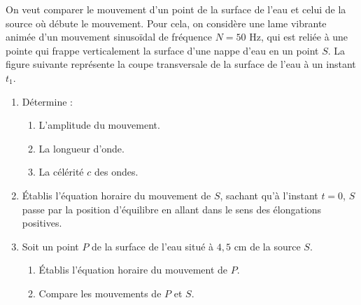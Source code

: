 \documentclass[11pt]{article}
\begin{document}
On veut comparer le mouvement d'un point de la surface de l'eau et celui de la source où débute le mouvement. Pour cela, on considère une lame vibrante animée d'un mouvement sinusoïdal de fréquence $N = 50$ Hz, qui est reliée à une pointe qui frappe verticalement la surface d'une nappe d'eau en un point $S$. La figure suivante représente la coupe transversale de la surface de l'eau à un instant $t_1$.

\begin{center}
\end{center}

\begin{enumerate}
  \item Détermine :
  \begin{enumerate}[label=\alph*.]
    \item L'amplitude du mouvement.
    \item La longueur d'onde.
    \item La célérité $c$ des ondes.
  \end{enumerate}
  \item Établis l'équation horaire du mouvement de $S$, sachant qu'à l'instant $t = 0$, $S$ passe par la position d'équilibre en allant dans le sens des élongations positives.
  \item Soit un point $P$ de la surface de l'eau situé à $4{,}5$ cm de la source $S$.
  \begin{enumerate}[label=\alph*.]
    \item Établis l'équation horaire du mouvement de $P$.
    \item Compare les mouvements de $P$ et $S$.
  \end{enumerate}
\end{enumerate}
\end{document}
